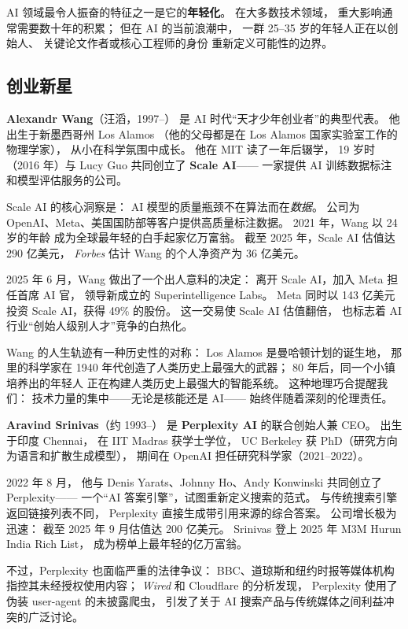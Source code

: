 AI 领域最令人振奋的特征之一是它的\textbf{年轻化}。
在大多数技术领域，
重大影响通常需要数十年的积累；
但在 AI 的当前浪潮中，
一群 25--35 岁的年轻人正在以创始人、
关键论文作者或核心工程师的身份
重新定义可能性的边界。

\subsection{创业新星}

\textbf{Alexandr Wang}（汪滔，1997--）
是 AI 时代``天才少年创业者''的典型代表。
他出生于新墨西哥州 Los Alamos
（他的父母都是在 Los Alamos 国家实验室工作的物理学家），
从小在科学氛围中成长。
他在 MIT 读了一年后辍学，
19 岁时（2016 年）与 Lucy Guo 共同创立了 \textbf{Scale AI}——
一家提供 AI 训练数据标注和模型评估服务的公司。

Scale AI 的核心洞察是：
AI 模型的质量瓶颈不在算法而在\emph{数据}。
公司为 OpenAI、Meta、美国国防部等客户提供高质量标注数据。
2021 年，Wang 以 24 岁的年龄
成为全球最年轻的白手起家亿万富翁。
截至 2025 年，Scale AI 估值达 290 亿美元，
\emph{Forbes} 估计 Wang 的个人净资产为 36 亿美元。

2025 年 6 月，Wang 做出了一个出人意料的决定：
离开 Scale AI，加入 Meta 担任首席 AI 官，
领导新成立的 Superintelligence Labs。
Meta 同时以 143 亿美元投资 Scale AI，获得 49\% 的股份。
这一交易使 Scale AI 估值翻倍，
也标志着 AI 行业``创始人级别人才''竞争的白热化。

\begin{keybox}
Wang 的人生轨迹有一种历史性的对称：
Los Alamos 是曼哈顿计划的诞生地，
那里的科学家在 1940 年代创造了人类历史上最强大的武器；
80 年后，同一个小镇培养出的年轻人
正在构建人类历史上最强大的智能系统。
这种地理巧合提醒我们：
技术力量的集中——无论是核能还是 AI——
始终伴随着深刻的伦理责任。
\end{keybox}

\textbf{Aravind Srinivas}（约 1993--）
是 \textbf{Perplexity AI} 的联合创始人兼 CEO。
出生于印度 Chennai，
在 IIT Madras 获学士学位，
UC Berkeley 获 PhD（研究方向为语言和扩散生成模型），
期间在 OpenAI 担任研究科学家（2021--2022）。

2022 年 8 月，
他与 Denis Yarats、Johnny Ho、Andy Konwinski 共同创立了 Perplexity——
一个``AI 答案引擎''，试图重新定义搜索的范式。
与传统搜索引擎返回链接列表不同，
Perplexity 直接生成带引用来源的综合答案。
公司增长极为迅速：
截至 2025 年 9 月估值达 200 亿美元。
Srinivas 登上 2025 年 M3M Hurun India Rich List，
成为榜单上最年轻的亿万富翁。

不过，Perplexity 也面临严重的法律争议：
BBC、道琼斯和纽约时报等媒体机构指控其未经授权使用内容；
\emph{Wired} 和 Cloudflare 的分析发现，
Perplexity 使用了伪装 user-agent 的未披露爬虫，
引发了关于 AI 搜索产品与传统媒体之间利益冲突的广泛讨论。

